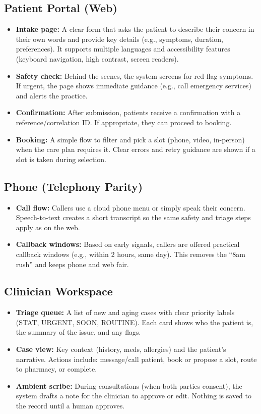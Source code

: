 \documentclass[11pt]{article}
\begin{document}
\subsection*{Patient Portal (Web)}
\begin{itemize}
  \item \textbf{Intake page:} A clear form that asks the patient to describe their concern in their own words and provide key details (e.g., symptoms, duration, preferences). It supports multiple languages and accessibility features (keyboard navigation, high contrast, screen readers).
  \item \textbf{Safety check:} Behind the scenes, the system screens for red-flag symptoms. If urgent, the page shows immediate guidance (e.g., call emergency services) and alerts the practice.
  \item \textbf{Confirmation:} After submission, patients receive a confirmation with a reference/correlation ID. If appropriate, they can proceed to booking.
  \item \textbf{Booking:} A simple flow to filter and pick a slot (phone, video, in-person) when the care plan requires it. Clear errors and retry guidance are shown if a slot is taken during selection.
\end{itemize}

\subsection*{Phone (Telephony Parity)}
\begin{itemize}
  \item \textbf{Call flow:} Callers use a cloud phone menu or simply speak their concern. Speech-to-text creates a short transcript so the same safety and triage steps apply as on the web.
  \item \textbf{Callback windows:} Based on early signals, callers are offered practical callback windows (e.g., within 2 hours, same day). This removes the ``8am rush'' and keeps phone and web fair.
\end{itemize}

\subsection*{Clinician Workspace}
\begin{itemize}
  \item \textbf{Triage queue:} A list of new and aging cases with clear priority labels (STAT, URGENT, SOON, ROUTINE). Each card shows who the patient is, the summary of the issue, and any flags.
  \item \textbf{Case view:} Key context (history, meds, allergies) and the patient's narrative. Actions include: message/call patient, book or propose a slot, route to pharmacy, or complete.
  \item \textbf{Ambient scribe:} During consultations (when both parties consent), the system drafts a note for the clinician to approve or edit. Nothing is saved to the record until a human approves.
\end{itemize}
\end{document}
